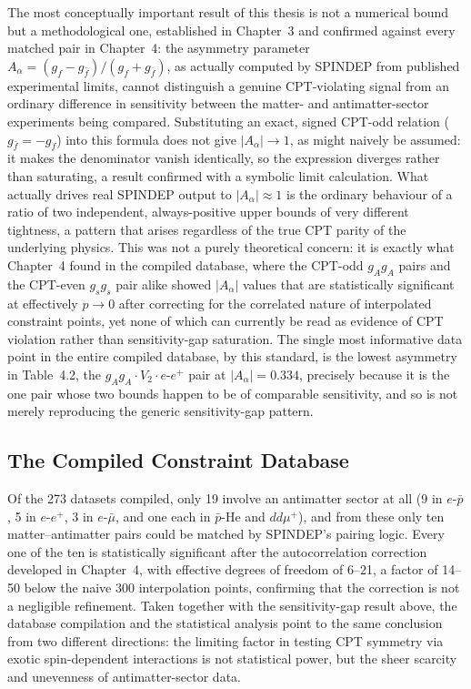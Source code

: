 \documentclass[main]{subfiles}
\begin{document}
The most conceptually important result of this thesis is not a numerical
bound but a methodological one, established in Chapter~3 and confirmed
against every matched pair in Chapter~4: the asymmetry parameter
$A_\alpha=(g_f-g_{\bar f})/(g_f+g_{\bar f})$, as actually computed by
SPINDEP from published experimental limits, cannot distinguish a genuine
CPT-violating signal from an ordinary difference in sensitivity between the
matter- and antimatter-sector experiments being compared. Substituting an
exact, signed CPT-odd relation ($g_{\bar f}=-g_f$) into this formula does
not give $|A_\alpha|\to1$, as might naively be assumed: it makes the
denominator vanish identically, so the expression diverges rather than
saturating, a result confirmed with a symbolic limit calculation. What
actually drives real SPINDEP output to $|A_\alpha|\approx1$ is the ordinary
behaviour of a ratio of two independent, always-positive upper bounds of
very different tightness, a pattern that arises regardless of the true
CPT parity of the underlying physics. This was not a purely theoretical
concern: it is exactly what Chapter~4 found in the compiled database, where
the CPT-odd $g_Ag_A$ pairs and the CPT-even $g_sg_s$ pair alike showed
$|A_\alpha|$ values that are statistically significant at effectively
$p\to0$ after correcting for the correlated nature of interpolated
constraint points, yet none of which can currently be read as evidence of
CPT violation rather than sensitivity-gap saturation. The single most
informative data point in the entire compiled database, by this standard,
is the lowest asymmetry in Table~4.2, the $g_Ag_A\cdot V_2\cdot
e$-$e^+$ pair at $|A_\alpha|=0.334$, precisely because it is the one pair
whose two bounds happen to be of comparable sensitivity, and so is not
merely reproducing the generic sensitivity-gap pattern.

\subsection{The Compiled Constraint Database}

Of the 273 datasets compiled, only 19 involve an antimatter sector at all
(9 in $e$-$\bar p$, 5 in $e$-$e^+$, 3 in $e$-$\bar\mu$, and one each in
$\bar p$-He and $dd\mu^+$), and from these only ten matter--antimatter
pairs could be matched by SPINDEP's pairing logic.
Every one of the ten is statistically significant after the
autocorrelation correction developed in Chapter~4, with effective degrees
of freedom of 6--21, a factor of 14--50 below the naive 300 interpolation
points, confirming that the correction is not a negligible refinement.
Taken together with the sensitivity-gap result above, the database
compilation and the statistical analysis point to the same conclusion from
two different directions: the limiting factor in testing CPT symmetry via
exotic spin-dependent interactions is not statistical power, but the sheer
scarcity and unevenness of antimatter-sector data.
\end{document}
